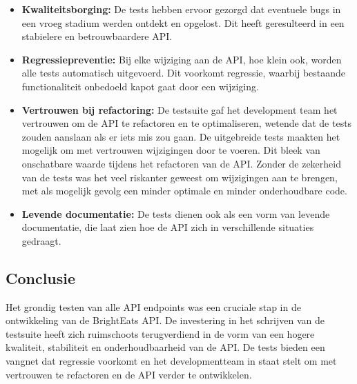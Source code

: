 \begin{itemize}
\item \textbf{Kwaliteitsborging:} De tests hebben ervoor gezorgd dat eventuele bugs in een vroeg stadium werden ontdekt en opgelost. Dit heeft geresulteerd in een stabielere en betrouwbaardere API.
\item \textbf{Regressiepreventie:} Bij elke wijziging aan de API, hoe klein ook, worden alle tests automatisch uitgevoerd. Dit voorkomt regressie, waarbij bestaande functionaliteit onbedoeld kapot gaat door een wijziging.
\item \textbf{Vertrouwen bij refactoring:} De testsuite gaf het development team het vertrouwen om de API te refactoren en te optimaliseren, wetende dat de tests zouden aanslaan als er iets mis zou gaan. De uitgebreide tests maakten het mogelijk om met vertrouwen wijzigingen door te voeren. Dit bleek van onschatbare waarde tijdens het refactoren van de API. Zonder de zekerheid van de tests was het veel riskanter geweest om wijzigingen aan te brengen, met als mogelijk gevolg een minder optimale en minder onderhoudbare code.
\item \textbf{Levende documentatie:} De tests dienen ook als een vorm van levende documentatie, die laat zien hoe de API zich in verschillende situaties gedraagt.
\end{itemize}

\subsection{Conclusie}

Het grondig testen van alle API endpoints was een cruciale stap in de ontwikkeling van de Bright\-Eats API. De investering in het schrijven van de testsuite heeft zich ruimschoots terugverdiend in de vorm van een hogere kwaliteit, stabiliteit en onderhoudbaarheid van de API. De tests bieden een vangnet dat regressie voorkomt en het developmentteam in staat stelt om met vertrouwen te refactoren en de API verder te ontwikkelen.

